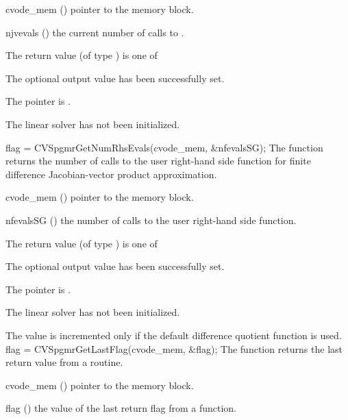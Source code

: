 {
  \begin{args}
  \item[cvode\_mem] ()
    pointer to the {\cvode} memory block.
  \item[njvevals] ()
    the current number of calls to .
  \end{args}
}
{
  The return value  (of type ) is one of
  \begin{args}
  \item[\Id{CVSPGMR\_SUCCESS}] 
    The optional output value has been successfully set.
  \item[\Id{CVSPGMR\_MEM\_NULL}]
    The  pointer is .
  \item[\Id{CVSPGMR\_LMEM\_NULL}]
    The {\cvspgmr} linear solver has not been initialized.
  \end{args}
}
{}
{
  flag = CVSpgmrGetNumRhsEvals(cvode\_mem, \&nfevalsSG);
}
{
  The function  returns the
  number of calls to the user right-hand side function for
  finite difference Jacobian-vector product approximation.
}
{
  \begin{args}
  \item[cvode\_mem] ()
    pointer to the {\cvode} memory block.
  \item[nfevalsSG] ()
    the number of calls to the user right-hand side function.
  \end{args}
}
{
  The return value  (of type ) is one of
  \begin{args}
  \item[\Id{CVSPGMR\_SUCCESS}] 
    The optional output value has been successfully set.
  \item[\Id{CVSPGMR\_MEM\_NULL}]
    The  pointer is .
  \item[\Id{CVSPGMR\_LMEM\_NULL}]
    The {\cvspgmr} linear solver has not been initialized.
  \end{args}
}
{
  The value  is incremented only if the default 
   difference quotient function is used.
}
{
  flag = CVSpgmrGetLastFlag(cvode\_mem, \&flag);
}
{
  The function  returns the
  last return value from a {\cvspgmr} routine. 
}
{
  \begin{args}
  \item[cvode\_mem] ()
    pointer to the {\cvode} memory block.
  \item[flag] ()
    the value of the last return flag from a {\cvspgmr} function.
  \end{args}
}
